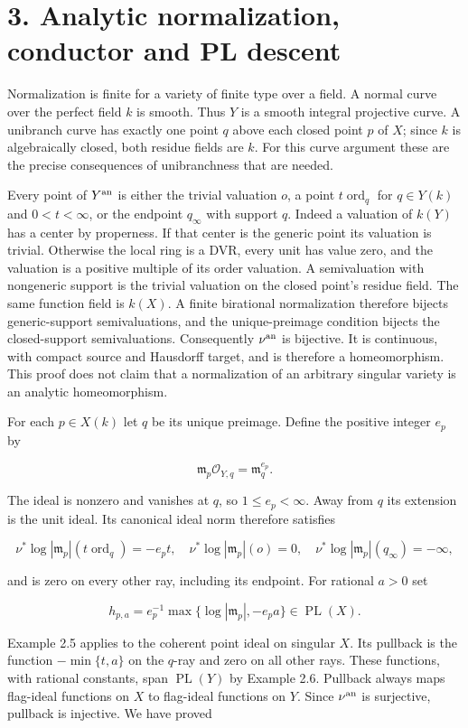 \documentclass[11pt]{article}
\begin{document}
\section*{3. Analytic normalization, conductor and PL descent}
Normalization is finite for a variety of finite type over a field. A normal curve over the perfect field $k$ is smooth. Thus $Y$ is a smooth integral projective curve. A unibranch curve has exactly one point $q$ above each closed point $p$ of $X$; since $k$ is algebraically closed, both residue fields are $k$. For this curve argument these are the precise consequences of unibranchness that are needed.

Every point of $Y^{\rm an}$ is either the trivial valuation $o$, a point $t\operatorname{ord}_q$ for $q\in Y(k)$ and $0<t<\infty$, or the endpoint $q_\infty$ with support $q$. Indeed a valuation of $k(Y)$ has a center by properness. If that center is the generic point its valuation is trivial. Otherwise the local ring is a DVR, every unit has value zero, and the valuation is a positive multiple of its order valuation. A semivaluation with nongeneric support is the trivial valuation on the closed point's residue field. The same function field is $k(X)$. A finite birational normalization therefore bijects generic-support semivaluations, and the unique-preimage condition bijects the closed-support semivaluations. Consequently $\nu^{\rm an}$ is bijective. It is continuous, with compact source and Hausdorff target, and is therefore a homeomorphism. This proof does not claim that a normalization of an arbitrary singular variety is an analytic homeomorphism.

For each $p\in X(k)$ let $q$ be its unique preimage. Define the positive integer $e_p$ by

\[
 \mathfrak m_p\mathcal O_{Y,q}=\mathfrak m_q^{e_p}.
\]

The ideal is nonzero and vanishes at $q$, so $1\leq e_p<\infty$. Away from $q$ its extension is the unit ideal. Its canonical ideal norm therefore satisfies

\[
 \nu^*\log|\mathfrak m_p|(t\operatorname{ord}_q)=-e_pt,
 \quad \nu^*\log|\mathfrak m_p|(o)=0,
 \quad \nu^*\log|\mathfrak m_p|(q_\infty)=-\infty,
\]

and is zero on every other ray, including its endpoint. For rational $a>0$ set

\[
 h_{p,a}=e_p^{-1}\max\{\log|\mathfrak m_p|,-e_pa\}\in\operatorname{PL}(X).
\]

Example 2.5 applies to the coherent point ideal on singular $X$. Its pullback is the function $-\min\{t,a\}$ on the $q$-ray and zero on all other rays. These functions, with rational constants, span $\operatorname{PL}(Y)$ by Example 2.6. Pullback always maps flag-ideal functions on $X$ to flag-ideal functions on $Y$. Since $\nu^{\rm an}$ is surjective, pullback is injective. We have proved
\end{document}
